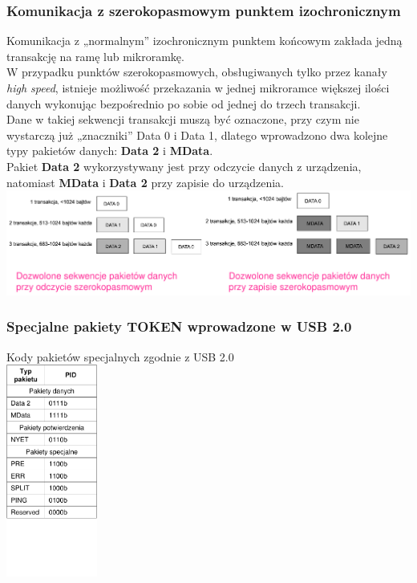 	\subsubsection{Komunikacja z szerokopasmowym punktem izochronicznym}
	Komunikacja z „normalnym” izochronicznym punktem końcowym zakłada jedną transakcję na ramę lub mikroramkę.\\
	W przypadku punktów szerokopasmowych, obsługiwanych tylko przez kanały \emph{high speed}, istnieje możliwość przekazania w jednej mikroramce większej ilości danych wykonując bezpośrednio po sobie od jednej do trzech transakcji.\\
	Dane w takiej sekwencji transakcji muszą być oznaczone, przy czym nie wystarczą już „znaczniki” Data 0 i Data 1, dlatego wprowadzono dwa kolejne typy pakietów danych: \textbf{Data 2} i \textbf{MData}.\\
	Pakiet \textbf{Data 2} wykorzystywany jest przy odczycie danych z urządzenia, natomiast \textbf{MData} i \textbf{Data 2} przy zapisie do urządzenia.\\
	\includegraphics[width=15cm]{./wyklady/USB_56_1.pdf}
	\subsubsection{Specjalne pakiety TOKEN wprowadzone w USB 2.0}
	Kody pakietów specjalnych zgodnie z USB 2.0\\
	\includegraphics[width=3cm]{./wyklady/USB_57_1.pdf}
